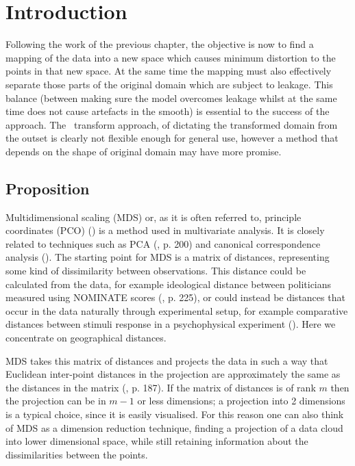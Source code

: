 \label{chap-mds}
\section{Introduction}

Following the work of the previous chapter, the objective is now to find a mapping of the data into a new space which causes minimum distortion to the points in that new space. At the same time the mapping must also effectively separate those parts of the original domain which are subject to leakage. This balance (between making sure the model overcomes leakage whilst at the same time does not cause artefacts in the smooth) is essential to the success of the approach. The \sch\ transform approach, of dictating the transformed domain from the outset is clearly not flexible enough for general use, however a method that depends on the shape of original domain may have more promise.

\subsection{Proposition}

Multidimensional scaling (MDS) or, as it is often referred to, principle coordinates (PCO) (\cite{gower1966}) is a method used in multivariate analysis. It is closely related to techniques such as PCA (\cite{chatfieldcollins}, p. 200) and canonical correspondence analysis (\cite{terbraak}). The starting point for MDS is a matrix of distances, representing some kind of dissimilarity between observations. This distance could be calculated from the data, for example ideological distance between politicians measured using NOMINATE scores (\cite{quantss}, p. 225), or could instead be distances that occur in the data naturally through experimental setup,  for example comparative distances between stimuli response in a psychophysical experiment (\cite{torgerson}). Here we concentrate on geographical distances.

MDS takes this matrix of distances and projects the data in such a way that Euclidean inter-point distances in the projection are approximately the same as the distances in the matrix (\cite{chatfieldcollins}, p. 187). If the matrix of distances is of rank $m$ then the projection can be in $m-1$ or less dimensions; a projection into 2 dimensions is a typical choice, since it is easily visualised. For this reason one can also think of MDS as a dimension reduction technique, finding a projection of a data cloud into lower dimensional space, while still retaining information about the dissimilarities between the points.

